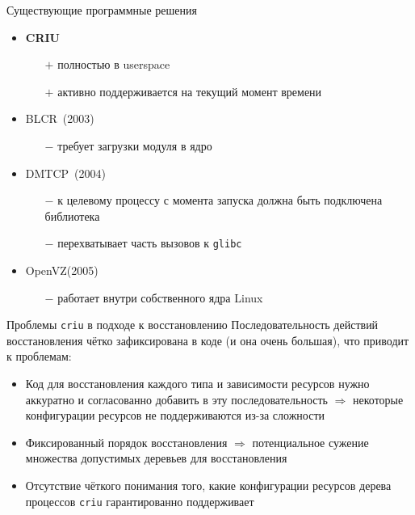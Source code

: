 \begin{frame}{Существующие программные решения}
\begin{itemize}
	\item \textbf{CRIU}
		\begin{itemize}
			\item[\color{green} $+$] полностью в userspace
			\item[\color{green} $+$] активно поддерживается на текущий момент времени
		\end{itemize}
	\item BLCR\footnotemark \ (2003)
		\begin{itemize}
				\item[\color{red} $-$] требует загрузки модуля в ядро
		\end{itemize}
	\item DMTCP\footnotemark\ (2004)
		\begin{itemize}
			\item[\color{red} $-$] к целевому процессу с момента запуска должна быть подключена библиотека
			\item[\color{red} $-$] перехватывает часть вызовов к \texttt{glibc}
		\end{itemize}
	\item OpenVZ(2005)
		\begin{itemize}
			\item[\color{red} $-$] работает внутри собственного ядра Linux
		\end{itemize}
\end{itemize}
\end{frame}

\begin{frame}{Проблемы \texttt{criu} в подходе к восстановлению}
Последовательность действий восстановления чётко зафиксирована в коде (и она очень большая), что приводит к проблемам:
\begin{itemize}
	\item Код для восстановления каждого типа и зависимости ресурсов нужно аккуратно и согласованно добавить в эту последовательность $\Rightarrow$ некоторые конфигурации ресурсов не поддерживаются из-за сложности
	\item Фиксированный порядок восстановления $\Rightarrow$ потенциальное сужение множества допустимых деревьев для восстановления
	\item Отсутствие чёткого понимания того, какие конфигурации ресурсов дерева процессов \texttt{criu} гарантированно поддерживает
\end{itemize}
\end{frame}

